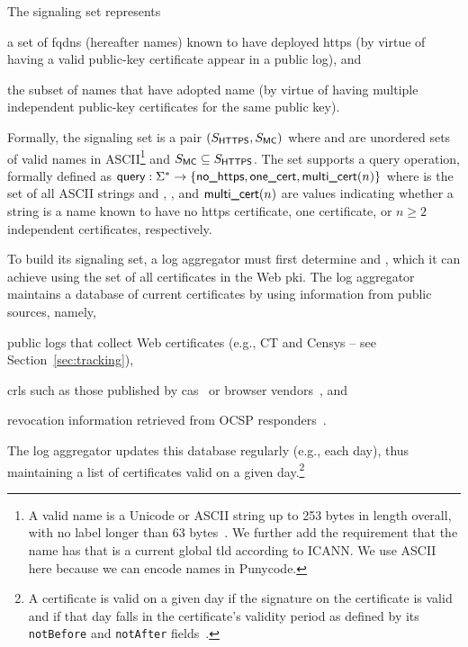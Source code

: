 The signaling set represents
\begin{inparaenum}
\item a set of \acp{fqdn} (hereafter names) known to have deployed \ac{https}
  (by virtue of having a valid public-key certificate appear in a public log), and
\item the subset of names that have adopted \ac{name} (by
  virtue of having multiple independent public-key certificates for the same
  public key).
\end{inparaenum}
Formally, the signaling set is a pair $(S_{\textsf{HTTPS}}, S_{\textsf{MC}})$ where
\httpsset and \multicertset are unordered sets of valid names in
ASCII\footnote{A valid name is a Unicode or ASCII string up to 253 bytes in
  length overall, with no label longer than 63 bytes~\cite{rfc1035}. We further
  add the requirement that the name has  that is a current global
\ac{tld} according to ICANN. We use ASCII here because we can encode names in
Punycode.} and $S_{\textsf{MC}} \subseteq S_{\textsf{HTTPS}}$. The set supports a query
operation, formally defined as $\textsf{query}: \Sigma^* \to \{\textsf{no\_https}, \textsf{one\_cert},
\textsf{multi\_cert}(n)\}$ where \strings is the set of all ASCII strings and \nohttps,
\onecert, and $\textsf{multi\_cert}(n)$ are values indicating whether a string is a name
known to have no \ac{https} certificate, one certificate, or $n\geq 2$
independent certificates, respectively.

To build its signaling set, a log aggregator must first determine \httpsset
and \multicertset, which it can achieve using the set of all certificates in the
Web \ac{pki}. The log aggregator maintains a database of current certificates by
using information from public sources, namely,
\begin{inparaenum}
\item public logs that collect Web certificates 
  (e.g., CT and Censys -- see Section~\ref{sec:tracking}),
\item \acp{crl} such as those published by \acp{ca}~\cite{rfc5280} or browser
  vendors~\cite{langley2012revocation, goodwin2015revoking}, and
\item revocation information retrieved from OCSP responders~\cite{rfc6960}.
\end{inparaenum}
The log aggregator updates this database regularly (e.g., each day), thus
maintaining a list of certificates valid on a given day.\footnote{A certificate
  is valid on a given day if the signature on the certificate is valid and if
  that day falls in the certificate's validity period as defined by its
\texttt{notBefore} and \texttt{notAfter} fields~\cite{rfc5280}.}


